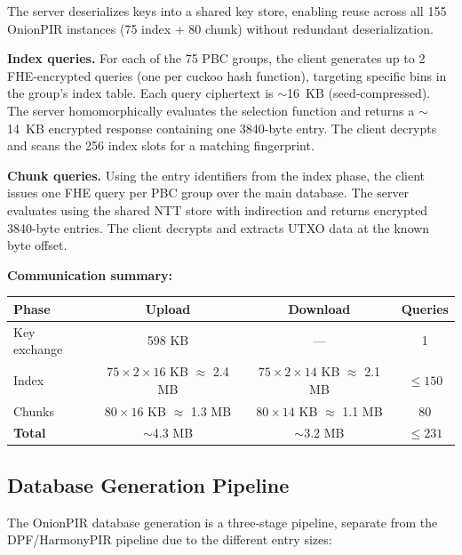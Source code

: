 The server deserializes keys into a shared key store, enabling reuse across all 155 OnionPIR instances (75 index + 80 chunk) without redundant deserialization.

\textbf{Index queries.} For each of the 75 PBC groups, the client generates up to 2 FHE-encrypted queries (one per cuckoo hash function), targeting specific bins in the group's index table. Each query ciphertext is $\sim$16~KB (seed-compressed). The server homomorphically evaluates the selection function and returns a $\sim$14~KB encrypted response containing one 3840-byte entry. The client decrypts and scans the 256 index slots for a matching fingerprint.

\textbf{Chunk queries.} Using the entry identifiers from the index phase, the client issues one FHE query per PBC group over the main database. The server evaluates using the shared NTT store with indirection and returns encrypted 3840-byte entries. The client decrypts and extracts UTXO data at the known byte offset.

\textbf{Communication summary:}
\begin{center}
\begin{tabular}{|l|c|c|c|}
\hline
\textbf{Phase} & \textbf{Upload} & \textbf{Download} & \textbf{Queries} \\
\hline
Key exchange & 598 KB & --- & 1 \\
Index & $75 \times 2 \times 16$ KB $\approx$ 2.4 MB & $75 \times 2 \times 14$ KB $\approx$ 2.1 MB & $\leq 150$ \\
Chunks & $80 \times 16$ KB $\approx$ 1.3 MB & $80 \times 14$ KB $\approx$ 1.1 MB & 80 \\
\hline
\textbf{Total} & $\sim$4.3 MB & $\sim$3.2 MB & $\leq 231$ \\
\hline
\end{tabular}
\end{center}

\subsection{Database Generation Pipeline}
\label{sec:onion-dbgen}

The OnionPIR database generation is a three-stage pipeline, separate from the DPF/HarmonyPIR pipeline due to the different entry sizes:

